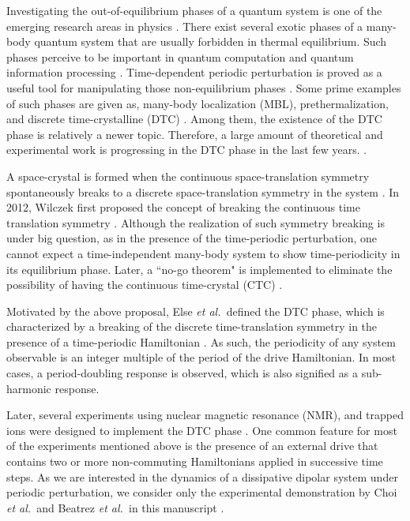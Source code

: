 \documentclass[prl,aps,preprint,floatfix]{revtex4-2}
\newcommand{\etal}{\textit{et al.\ }}
\begin{document}
Investigating the out-of-equilibrium phases of a quantum system is one of the emerging
research areas in physics \cite{Polkovnikov2011,eisert_quantum_2015}. There exist several
exotic phases of a many-body quantum system that are usually forbidden in thermal
equilibrium. Such phases perceive to be important in quantum computation and quantum
information processing \cite{abobeih_atomic-scale_2019, frey_realization_2022}.
Time-dependent periodic perturbation is proved as a useful tool for manipulating those
non-equilibrium phases \cite{Goldman2014,Abanin2015}. Some prime examples of such phases
are given as, many-body localization (MBL), prethermalization, and discrete
time-crystalline (DTC) \cite{abanin2017, ueda_2020,yao_discrete_2017}. Among them, the
existence of the DTC phase is relatively a newer topic.  Therefore, a large amount of
theoretical and experimental work is progressing in the DTC phase in the last few years.
\cite{sacha_time_2018, khemani2019}.

A space-crystal is formed when the continuous space-translation symmetry spontaneously breaks to a discrete
space-translation symmetry in the system \cite{ashcroft1976}. In 2012, Wilczek first proposed the concept of
breaking the continuous time translation symmetry \cite{wilczek_quantum_2012}. Although the realization of
such symmetry breaking is under big question, as in the presence of the time-periodic perturbation, one
cannot expect a time-independent many-body system to show time-periodicity in its equilibrium phase. Later,
a ``no-go theorem" is implemented to eliminate the possibility of having the continuous time-crystal (CTC)
\cite{bruno_impossibility_2013, watanabe_absence_2015}.

Motivated by the above proposal, Else \etal defined the DTC phase, which is characterized by a breaking of
the discrete time-translation symmetry in the presence of a time-periodic Hamiltonian
\cite{else_floquet_2016}. As such, the periodicity of any system observable is an integer multiple of the
period of the drive Hamiltonian. In most cases, a period-doubling response is observed, which is also
signified as a sub-harmonic response.

Later, several experiments using nuclear magnetic resonance (NMR), and trapped ions were designed to
implement the DTC phase \cite{zhang_observation_2017, choi_observation_2017, rovny_observation_2018,
pal_temporal_2018, kyprianidis_observation_2021, beatrez_critical_2023}.  One common feature for most of the
experiments mentioned above is the presence of an external drive that contains two or more non-commuting
Hamiltonians applied in successive time steps. As we are interested in the dynamics of a dissipative dipolar
system under periodic perturbation, we consider only the experimental demonstration by Choi \etal and
Beatrez \etal in this manuscript \cite{choi_observation_2017, beatrez_critical_2023}. 
\end{document}
